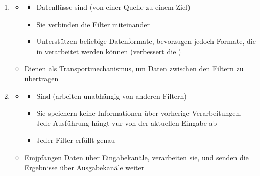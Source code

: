 \begin{infoBox}[title=Hauptkomponenten und ihre Funktionen]
    \begin{enumerate}
        \item {}
        \begin{itemize}
            \item {}
            \begin{itemize}
                \item Datenflüsse sind  (von einer Quelle zu einem Ziel)
                \item Sie verbinden die Filter miteinander
                \item Unterstützen beliebige Datenformate, bevorzugen jedoch Formate, die in  verarbeitet werden können (verbessert die )
            \end{itemize}
            \item {} Dienen als Transportmechanismus, um Daten zwischen den Filtern zu übertragen
        \end{itemize}
        \item {}
        \begin{itemize}
            \item {}
            \begin{itemize}
                \item Sind  (arbeiten unabhängig von anderen Filtern)
                \item {} Sie speichern keine Informationen über vorherige Verarbeitungen. Jede Ausführung hängt vur von der aktuellen Eingabe ab
                \item {} Jeder Filter erfüllt genau 
            \end{itemize}
            \item {} Emjpfangen Daten über Eingabekanäle, verarbeiten sie, und senden die Ergebnisse über Ausgabekanäle weiter
        \end{itemize}
    \end{enumerate}
\end{infoBox}
